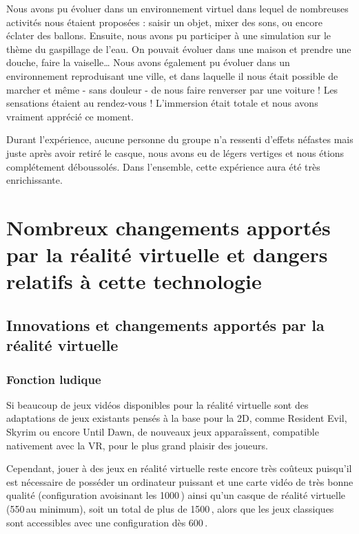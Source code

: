 \documentclass[12pt, a4paper]{report}
\newcommand{\euro}{\,\EUR}
\begin{document}
Nous avons pu évoluer dans un environnement virtuel dans lequel de nombreuses activités nous étaient proposées : saisir un objet, mixer des sons, ou encore éclater des ballons. Ensuite, nous avons pu participer à une simulation sur le thème du gaspillage de l'eau. On pouvait évoluer dans une maison et prendre une douche, faire la vaiselle\ldots{} Nous avons également pu évoluer dans un environnement reproduisant une ville, et dans laquelle il nous était possible de marcher et même - sans douleur - de nous faire renverser par une voiture ! Les sensations étaient au rendez-vous ! L'immersion était totale et nous avons vraiment apprécié ce moment.

Durant l'expérience, aucune personne du groupe n'a ressenti d'effets néfastes mais juste après avoir retiré le casque, nous avons eu de légers vertiges et nous étions complétement déboussolés. Dans l'ensemble, cette expérience aura été très enrichissante.

\part[Changements et dangers]{Nombreux changements apportés par la réalité virtuelle et dangers relatifs à cette technologie}

\chapter[Innovations]{Innovations et changements apportés par la réalité virtuelle}

\section{Fonction ludique}

Si beaucoup de jeux vidéos disponibles pour la réalité virtuelle sont des adaptations de jeux existants pensés à la base pour la 2D, comme Resident Evil, Skyrim ou encore Until Dawn, de nouveaux jeux apparaîssent, compatible nativement avec la VR, pour le plus grand plaisir des joueurs.

Cependant, jouer à des jeux en réalité virtuelle reste encore très coûteux puisqu'il est nécessaire de posséder un ordinateur puissant et une carte vidéo de très bonne qualité (configuration avoisinant les 1000\euro) ainsi qu'un casque de réalité virtuelle (550\euro au minimum), soit un total de plus de 1500\euro{}, alors que les jeux classiques sont accessibles avec une configuration dès 600\euro.
\end{document}
